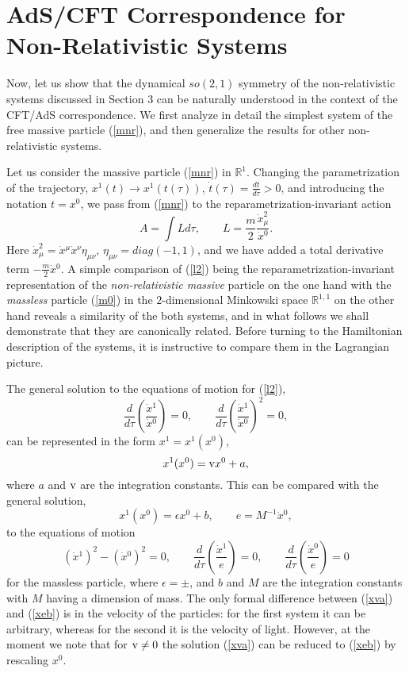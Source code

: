 \documentclass[a4paper,12pt]{article}
\def\R{\mathbb R}
\begin{document}
\section{AdS/CFT Correspondence for Non-Relativistic
Systems}


Now, let us show that the dynamical $so(2,1)$
symmetry of the non-relativistic systems discussed in
Section 3
can be naturally understood in the context of the
CFT/AdS correspondence.
We first analyze in detail the simplest
system of the free massive particle
(\ref{mnr}), and then generalize the results
for other non-relativistic systems.

Let us consider the massive particle
(\ref{mnr}) in
$\R^1$. Changing the parametrization
of the trajectory,
$x^1(t)\rightarrow x^1(t(\tau))$,
$\dot{t}(\tau)=\frac{dt}{d\tau}>0$,
and introducing the notation $t=x^0$,
we pass from (\ref{mnr}) to the
reparametrization-invariant action
\begin{equation}
A=\int Ld\tau,\qquad
L=\frac{m}{2}\frac{\dot{x}_\mu^2}{\dot{x}{}^0}.
\label{l2}
\end{equation}
Here $\dot{x}_\mu^2=\dot x{}^\mu\dot x{}^\nu\eta_{\mu\nu}$,
$\eta_{\mu\nu}=diag (-1,1)$,
and we have added a
total derivative term
$-\frac{m}{2}\dot x{}^0$.
A simple comparison of (\ref{l2})
being the reparametrization-invariant representation
of the {\it non-relativistic massive} particle
on the one hand
with the {\it massless} particle (\ref{m0})
in the $2$-dimensional
Minkowski space $\R^{1,1}$ on the other hand
reveals a
similarity of the both systems, and  in what follows we
shall
demonstrate that they are canonically related.
Before turning to the Hamiltonian description
of the systems, it is instructive to compare them
in the Lagrangian picture.

The general solution to the equations of motion for
(\ref{l2}),
\begin{equation}
\frac{d}{d\tau}
\left(
\frac{\dot{x}{}^1}{\dot{x}{}^0}\right)=0,
\qquad
\frac{d}{d\tau}
\left(
\frac{\dot{x}{}^1}{\dot{x}{}^0}\right)^2=0,
\label{x1x0}
\end{equation}
can be represented in the form
$x^1=x^1(x^0)$,
\begin{equation}
x^1(x^0)={\rm v} x^0+a,
\label{xva}
\end{equation}
where $a$ and ${\rm v}$ are the integration constants.
This can be compared with the general solution,
\begin{equation}
x^1(x^0)=\epsilon x^0+b,\qquad
e=M^{-1} \dot{x}{}^0,
\label{xeb}
\end{equation}
to the equations of motion
\[
(\dot{x}{}^{1})^2-(\dot{x}{}^0)^2=0,\qquad
\frac{d}{d\tau}
\left(
\frac{\dot{x}{}^1}{e}\right)=0,\qquad
\frac{d}{d\tau}
\left(
\frac{\dot{x}{}^0}{e}\right)=0
\]
for the massless particle,
where $\epsilon=\pm $, and $b$ and  $M$ are the integration
constants
with $M$ having a dimension of mass.
The only formal difference
between (\ref{xva}) and (\ref{xeb})
is in the velocity
of the particles: for the first system it can be arbitrary,
whereas for the second it is the velocity of light.
However, at the moment we note that
for ${\rm v}\neq 0$
the solution (\ref{xva}) can be
reduced to (\ref{xeb})
by rescaling $x^0$.
\end{document}
